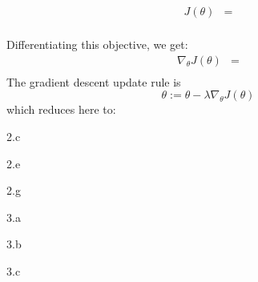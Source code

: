\begin{answer}
  
  \begin{align*}
      J(\theta)&=\\
  \end{align*}

  Differentiating this objective, we get:
  \begin{align*}
      \nabla_{\theta} J(\theta)&=\\
  \end{align*}
  The gradient descent update rule is
  \begin{equation*}
  \theta := \theta - \lambda \nabla_{\theta} J(\theta)
  \end{equation*}
  which reduces here to:
\end{answer}
\clearpage

\LARGE
2.c
\normalsize

\begin{answer}
\end{answer}
\clearpage

\LARGE
2.e
\normalsize

\begin{answer}
\end{answer}
\clearpage

\LARGE
2.g
\normalsize

\begin{answer}
\end{answer}
\clearpage

\LARGE
3.a
\normalsize

\begin{answer}
\end{answer}

\LARGE
3.b
\normalsize

\begin{answer}
\end{answer}

\LARGE
3.c
\normalsize

\begin{answer}
\end{answer}


